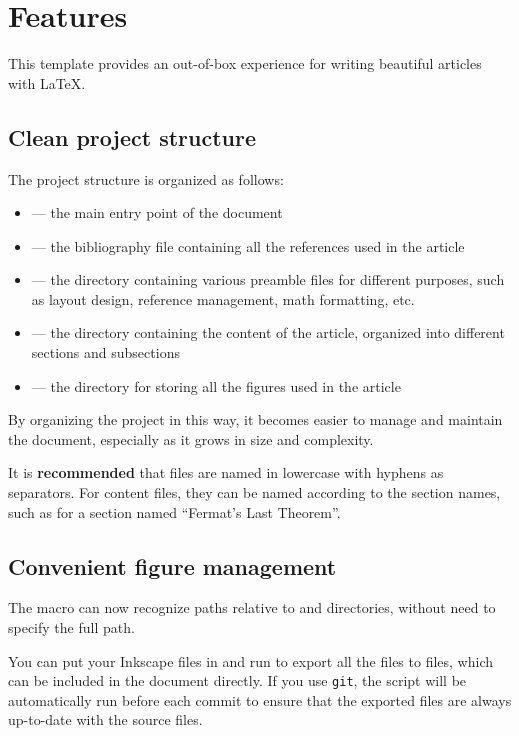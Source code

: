 \section{Features}

This template provides an out-of-box experience for writing beautiful articles with \LaTeX.

\subsection{Clean project structure}

The project structure is organized as follows:
\begin{itemize}
  \item {} --- the main entry point of the document
  \item {} --- the bibliography file containing all the references used in the article
  \item {} --- the directory containing various preamble files for different purposes, such as layout design, reference management, math formatting, etc.
  \item {} --- the directory containing the content of the article, organized into different sections and subsections
  \item {} --- the directory for storing all the figures used in the article
\end{itemize}

By organizing the project in this way, it becomes easier to manage and maintain the document, especially as it grows in size and complexity.

It is \textbf{recommended} that files are named in lowercase with hyphens as separators.
For content files, they can be named according to the section names, such as  for a section named ``Fermat's Last Theorem''.

\subsection{Convenient figure management}
\label{sec:convenient-figure-management}

The  macro can now recognize paths relative to  and  directories, without need to specify the full path.

You can put your Inkscape files in  and run  to export all the  files to  files, which can be included in the document directly.
If you use \texttt{git}, the script will be automatically run before each commit to ensure that the exported  files are always up-to-date with the source  files.

